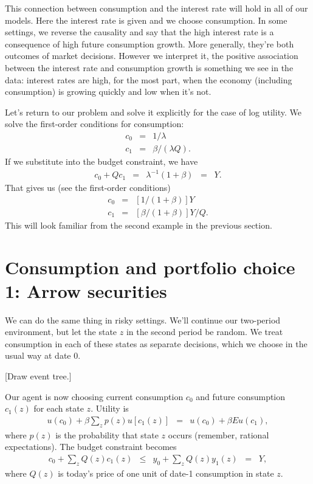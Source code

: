 \documentclass[11pt]{article}
\begin{document}
This connection between consumption and the interest rate
will hold in all of our models.
Here the interest rate is given and we choose consumption.
In some settings, we reverse the causality
and say that the high interest rate is a consequence
of high future consumption growth.
More generally, they're both outcomes of market decisions.
However we interpret it, the positive association between the interest rate
and consumption growth is something we see in the data:
interest rates are high, for the most part,
when the economy (including consumption) is growing quickly
and low when it's not.


Let's return to our problem and solve it explicitly
for the case of log utility.
We solve the first-order conditions for consumption:
\begin{eqnarray*}
        c_0  &=& 1/\lambda  \\
        c_1  &=& \beta/(\lambda Q) .
\end{eqnarray*}
If we substitute into the budget constraint,
we have
\begin{eqnarray}
    c_0 + Q c_1 &=& \lambda^{-1}
            \left(1 + \beta \right) \;\;=\;\; Y.
\end{eqnarray}
That gives us (see the first-order conditions)
\begin{eqnarray*}
        c_0  &=& [1/(1+\beta)] Y \\
        c_1  &=& [\beta/(1+\beta)] Y / Q  .
\end{eqnarray*}
This will look familiar from the second example in the previous section.



\section{Consumption and portfolio choice 1:  Arrow securities}

We can do the same thing in risky settings.
We'll continue our two-period environment,
but let the state $z$ in the second period be random.
We treat consumption in each of these states
as separate decisions, which we choose in the usual way
at date 0.

[Draw event tree.]

Our agent is now choosing current consumption $c_0$
and future consumption $c_1(z)$ for each state $z$.
Utility is
\begin{eqnarray}
    u(c_0) + \beta \sum_z p(z) u[c_1(z)]
    &=&     u(c_0) + \beta E u(c_1) ,
    \label{eq:utility-2period-stochastic}
\end{eqnarray}
where $p(z)$ is the probability that state $z$ occurs
(remember, rational expectations).
The budget constraint becomes
\begin{eqnarray}
    c_0 + \sum_z Q(z) c_1(z) &\leq& y_0 + \sum_z Q(z) y_1(z) \;\;=\;\; Y ,
    \label{eq:budget-2period-stochastic}
\end{eqnarray}
where $Q(z)$ is today's price of one unit of date-1 consumption in state $z$.
\end{document}
